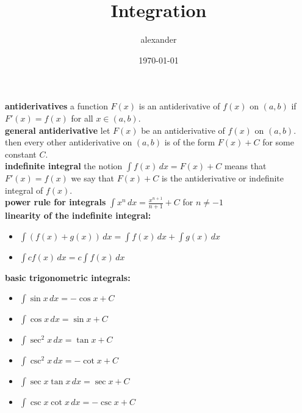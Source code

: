\documentclass{article}
\title{Integration}
\author{alexander}
\date{\today}
\begin{document}
\maketitle

\textbf{antiderivatives} a function $F(x)$ is an antiderivative of $f(x)$ on $(a, b)$ if $F'(x) = f(x)$ for all $x \in (a, b)$.\\

\textbf{general antiderivative} let $F(x)$ be an antiderivative of $f(x)$ on $(a, b)$. then every other antiderivative on $(a, b)$ is of the form $F(x) + C$ for some constant $C$.\\

\textbf{indefinite integral} the notion $\int f(x)\,dx = F(x) + C$ means that $F'(x) = f(x)$ we say that $F(x) + C$ is the antiderivative or indefinite integral of $f(x)$.\\

\textbf{power rule for integrals} $\int x^n\,dx = \frac{x^{n + 1}}{n + 1} + C$ for $n \neq -1$\\ 

\textbf{linearity of the indefinite integral:}
	\begin{itemize}
		\item $\int (f(x) + g(x))\,dx = \int f(x)\,dx + \int g(x)\,dx$
		\item $\int cf(x)\,dx = c\int f(x)\,dx$
	\end{itemize}

\textbf{basic trigonometric integrals:}
	\begin{itemize}		
		\item $\int \sin x \,dx = -\cos x + C$
		\item $\int \cos x \,dx = \sin x + C$
		\item $\int \sec^2 x \,dx = \tan x + C$
		\item $\int \csc^2 x \,dx = -\cot x + C$
		\item $\int \sec x \tan x \,dx = \sec x + C$
		\item $\int \csc x \cot x \,dx = -\csc x + C$
	\end{itemize}
\end{document}
